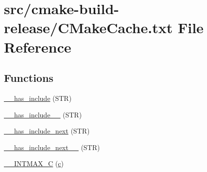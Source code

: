 \hypertarget{cmake-build-release_2CMakeCache_8txt}{}\section{src/cmake-\/build-\/release/\+C\+Make\+Cache.txt File Reference}
\label{cmake-build-release_2CMakeCache_8txt}
\subsection*{Functions}
\begin{DoxyCompactItemize}
\item 
\hyperlink{cmake-build-release_2CMakeCache_8txt_a15033d43fd4881ecb41d0a9ef3f98c8b}{\+\_\+\+\_\+has\+\_\+include} (S\+TR)
\item 
\hyperlink{cmake-build-release_2CMakeCache_8txt_a97e2b5b7d48e0c704f01b437bbb41bc3}{\+\_\+\+\_\+has\+\_\+include\+\_\+\+\_\+} (S\+TR)
\item 
\hyperlink{cmake-build-release_2CMakeCache_8txt_a6bc72b80bcdbfe30be5d38536affde6f}{\+\_\+\+\_\+has\+\_\+include\+\_\+next} (S\+TR)
\item 
\hyperlink{cmake-build-release_2CMakeCache_8txt_ac96b06945e62d6ea6764b6d86745ec26}{\+\_\+\+\_\+has\+\_\+include\+\_\+next\+\_\+\+\_\+} (S\+TR)
\item 
\hyperlink{cmake-build-release_2CMakeCache_8txt_a2f10a19f2682f0eb61615edae3fa69ef}{\+\_\+\+\_\+\+I\+N\+T\+M\+A\+X\+\_\+C} (\hyperlink{cmake-build-release_2CMakeCache_8txt_aac1d6a1710812201527c735f7c6afbaa}{c})
\end{DoxyCompactItemize}

